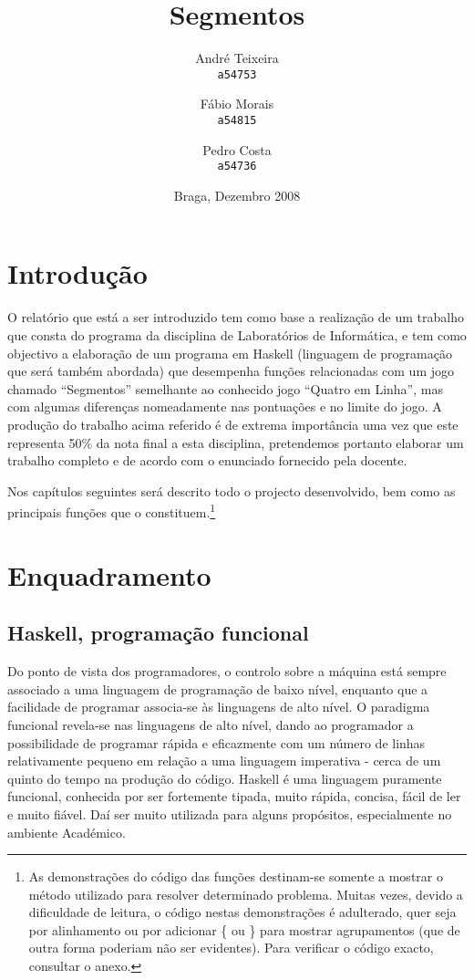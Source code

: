 \documentclass[a4paper,titlepage]{scrreprt}
\title{Segmentos}
\author{André Teixeira\\\texttt{\smaller a54753}
\and Fábio Morais\\\texttt{\smaller a54815}
\and Pedro Costa\\\texttt{\smaller a54736}}
\date{Braga, Dezembro 2008}
\begin{document}
\maketitle
\tableofcontents
\newpage
	\section{Introdução}
	O relatório que está a ser introduzido tem como base a realização de um trabalho que consta do programa da disciplina
	de Laboratórios de Informática, e tem como objectivo a elaboração de um programa em Haskell (linguagem de programação
	que será também abordada) que desempenha funções relacionadas com um jogo chamado ``Segmentos'' semelhante ao conhecido
	jogo ``Quatro em Linha'', mas com algumas diferenças nomeadamente nas pontuações e no limite do jogo. A produção do trabalho
	acima referido é de extrema importância uma vez que este representa 50\% da nota final a esta disciplina, pretendemos
	portanto elaborar um trabalho completo e de acordo com o enunciado fornecido pela docente.
	
	Nos capítulos seguintes será descrito todo o projecto desenvolvido, bem como as principais funções que o constituem.\footnote{As
	demonstrações do código das funções destinam-se somente a mostrar o método utilizado para resolver determinado problema. Muitas
	vezes, devido a dificuldade de leitura, o código nestas demonstrações é adulterado, quer seja por alinhamento ou por adicionar
	\{ ou \} para mostrar agrupamentos (que de outra forma poderiam não ser evidentes). Para verificar o código exacto, consultar o
	anexo.}
	\section{Enquadramento}
		\subsection{Haskell, programação funcional}
		Do ponto de vista dos programadores, o controlo sobre a máquina está sempre associado a uma linguagem de programação
		de baixo nível, enquanto que a facilidade de programar associa-se às linguagens de alto nível. O paradigma funcional
		revela-se nas linguagens de alto nível, dando ao programador a possibilidade de programar rápida e eficazmente com
		um número de linhas relativamente pequeno em relação a uma linguagem imperativa - cerca de um quinto do tempo na
		produção do código. Haskell é uma linguagem puramente funcional, conhecida por ser fortemente tipada, muito rápida,
		concisa, fácil de ler e muito fiável. Daí ser muito utilizada para alguns propósitos, especialmente no ambiente Académico.
\end{document}
